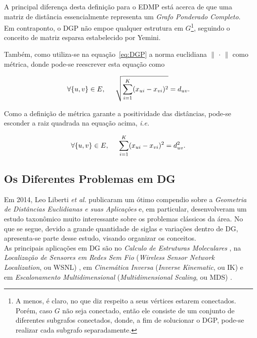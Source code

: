 A principal diferença desta definição para o EDMP está acerca de que uma matriz de distância essencialmente representa um \textit{Grafo Ponderado Completo}. Em contraponto, o DGP não empoe qualquer estrutura em $G$\footnote{A menos, é claro, no que diz respeito a seus vértices estarem conectados. Porém, caso $G$ não seja conectado, então ele consiste de um conjunto de diferentes subgrafos conectados, donde, a fim de solucionar o DGP, pode-se realizar cada subgrafo separadamente.}, seguindo o conceito de matriz esparsa estabelecido por Yemini.

Também, como utiliza-se na equação~\ref{eq:DGP} a norma euclidiana $\lVert$ $\cdot$ $\rVert$ como métrica, donde pode-se reescrever esta equação como

\begin{equation*}
	\forall \{u,v\} \in E, \hspace{0.5cm} \sqrt{\sum_{i=1}^{K}(x_{ui} - x_{vi})^2} = d_{uv}.
\end{equation*}

Como a definição de métrica garante a positividade das distâncias, pode-se esconder a raiz quadrada na equação acima, \textit{i.e.}

\begin{equation}
\forall \{u,v\} \in E, \hspace{0.5cm} \sum_{i=1}^{K}(x_{ui} - x_{vi})^2 = d_{uv}^2.
\label{eq:DGPSistemaQuadratico}
\end{equation}

\subsection*{Os Diferentes Problemas em DG}

Em 2014, Leo Liberti \textit{et al.} publicaram um ótimo compendio sobre a \textit{Geometria de Distâncias Euclidianas e suas Aplicações} e, em particular, desenvolveram um estudo  taxonômico muito interessante sobre os problemas clássicos da área. No que se segue, devido a grande quantidade de siglas e variações dentro de DG, apresenta-se parte desse estudo, visando organizar os conceitos. 
\\

As principais aplicações em DG são no \textit{Calculo de Estruturas Moleculares} \cite{crippen:DistancesAndMolecularConformation}, na \textit{Localização de Sensores em Redes Sem Fio} (\textit{Wireless Sensor Network Localization}, ou WSNL) \cite{yemini1978positioning}, em \textit{Cinemática Inversa} (\textit{Inverse Kinematic}, ou IK) \cite{cinematicaInversa} e em \textit{Escalonamento Multidimensional} (\textit{Multidimensional Scaling}, ou MDS) \cite{multidimensionalScaling}.

